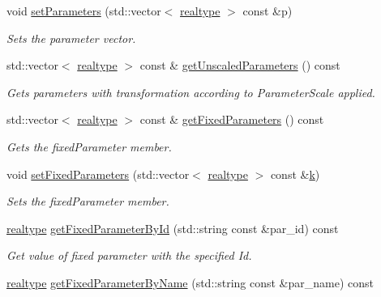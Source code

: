 \begin{DoxyCompactItemize}
void \mbox{\hyperlink{classamici_1_1_model_af1e95f6479d442fcb4c63d16763d4acd}{set\+Parameters}} (std\+::vector$<$ \mbox{\hyperlink{namespaceamici_a1bdce28051d6a53868f7ccbf5f2c14a3}{realtype}} $>$ const \&p)
\begin{DoxyCompactList}\small\item\em Sets the parameter vector. \end{DoxyCompactList}\item 
std\+::vector$<$ \mbox{\hyperlink{namespaceamici_a1bdce28051d6a53868f7ccbf5f2c14a3}{realtype}} $>$ const  \& \mbox{\hyperlink{classamici_1_1_model_a76f62d983fb3842cb695681f7ed9a9f0}{get\+Unscaled\+Parameters}} () const
\begin{DoxyCompactList}\small\item\em Gets parameters with transformation according to Parameter\+Scale applied. \end{DoxyCompactList}\item 
std\+::vector$<$ \mbox{\hyperlink{namespaceamici_a1bdce28051d6a53868f7ccbf5f2c14a3}{realtype}} $>$ const  \& \mbox{\hyperlink{classamici_1_1_model_a76b24282a74eaca67d656149310dc07c}{get\+Fixed\+Parameters}} () const
\begin{DoxyCompactList}\small\item\em Gets the fixed\+Parameter member. \end{DoxyCompactList}\item 
void \mbox{\hyperlink{classamici_1_1_model_a14ba63ae81b4e8fa1f46884b703e2c30}{set\+Fixed\+Parameters}} (std\+::vector$<$ \mbox{\hyperlink{namespaceamici_a1bdce28051d6a53868f7ccbf5f2c14a3}{realtype}} $>$ const \&\mbox{\hyperlink{classamici_1_1_model_adde50e0d8a99d20354c8403bf93fab6f}{k}})
\begin{DoxyCompactList}\small\item\em Sets the fixed\+Parameter member. \end{DoxyCompactList}\item 
\mbox{\hyperlink{namespaceamici_a1bdce28051d6a53868f7ccbf5f2c14a3}{realtype}} \mbox{\hyperlink{classamici_1_1_model_acc647ebbeaf0be737c7c165fa77eeca5}{get\+Fixed\+Parameter\+By\+Id}} (std\+::string const \&par\+\_\+id) const
\begin{DoxyCompactList}\small\item\em Get value of fixed parameter with the specified Id. \end{DoxyCompactList}\item 
\mbox{\hyperlink{namespaceamici_a1bdce28051d6a53868f7ccbf5f2c14a3}{realtype}} \mbox{\hyperlink{classamici_1_1_model_a99cc00a08b2f2d87d3eac047d00a7c57}{get\+Fixed\+Parameter\+By\+Name}} (std\+::string const \&par\+\_\+name) const

\end{DoxyCompactItemize}
